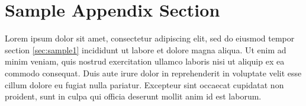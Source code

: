 \documentclass[preprint,12pt]{elsarticle}
\begin{document}
\section{Sample Appendix Section}
\label{sec:sample:appendix}
Lorem ipsum dolor sit amet, consectetur adipiscing elit, sed do eiusmod tempor section \ref{sec:sample1} incididunt ut labore et dolore magna aliqua. Ut enim ad minim veniam, quis nostrud exercitation ullamco laboris nisi ut aliquip ex ea commodo consequat. Duis aute irure dolor in reprehenderit in voluptate velit esse cillum dolore eu fugiat nulla pariatur. Excepteur sint occaecat cupidatat non proident, sunt in culpa qui officia deserunt mollit anim id est laborum.

  
 





\end{document}
